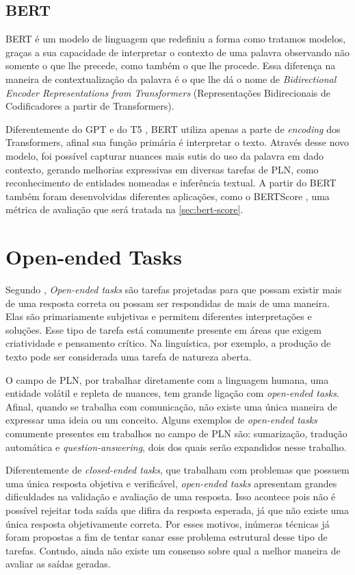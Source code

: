 \documentclass[cic,tc]{iiufrgs}
\begin{document}
\subsection{BERT}
BERT \cite{devlin2019bert} é um modelo de linguagem que redefiniu a forma como tratamos modelos, graças a sua capacidade de interpretar o contexto de uma palavra observando não somente o que lhe precede, como também o que lhe procede. Essa diferença na maneira de contextualização da palavra é o que lhe dá o nome de \textit{Bidirectional Encoder Representations from Transformers} (Representações Bidirecionais de Codificadores a partir de Transformers).

Diferentemente do GPT \cite{radford2018improving} e do T5 \cite{raffel2020exploring}, BERT utiliza apenas a parte de \textit{encoding} dos Transformers, afinal sua função primária é interpretar o texto. Através desse novo modelo, foi possível capturar nuances mais sutis do uso da palavra em dado contexto, gerando melhorias expressivas em diversas tarefas de PLN, como reconhecimento de entidades nomeadas e inferência textual. A partir do BERT também foram desenvolvidas diferentes aplicações, como o BERTScore \cite{bert-score}, uma métrica de avaliação que será tratada na \autoref{sec:bert-score}.

\section{Open-ended Tasks}
\label{sec:openendedtasks}
Segundo \citet{jastrzkebowska2021opening}, \textit{Open-ended tasks} são tarefas projetadas para que possam existir mais de uma resposta correta ou possam ser respondidas de mais de uma maneira. Elas são primariamente subjetivas e permitem diferentes interpretações e soluções. Esse tipo de tarefa está comumente presente em áreas que exigem criatividade e pensamento crítico. Na linguística, por exemplo, a produção de texto pode ser considerada uma tarefa de natureza aberta. 

O campo de PLN, por trabalhar diretamente com a linguagem humana, uma entidade volátil e repleta de nuances, tem grande ligação com \textit{open-ended tasks}. Afinal, quando se trabalha com comunicação, não existe uma única maneira de expressar uma ideia ou um conceito. Alguns exemplos de \textit{open-ended tasks} comumente presentes em trabalhos no campo de PLN são: sumarização, tradução automática e \textit{question-answering}, dois dos quais serão expandidos nesse trabalho.

Diferentemente de \textit{closed-ended tasks}, que trabalham com problemas que possuem uma única resposta objetiva e verificável, \textit{open-ended tasks} apresentam grandes dificuldades na validação e avaliação de uma resposta. Isso acontece pois não é possível rejeitar toda saída que difira da resposta esperada, já que não existe uma única resposta objetivamente correta. Por esses motivos, inúmeras técnicas já foram propostas a fim de tentar sanar esse problema estrutural desse tipo de tarefas. Contudo, ainda não existe um consenso sobre qual a melhor maneira de avaliar as saídas geradas.
\end{document}
